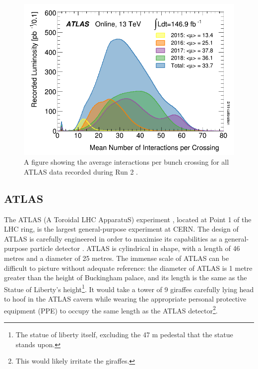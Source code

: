 \documentclass[12pt,a4paper,epsf,portrait,times,epsfig]{article}
\begin{document}
		\begin{figure}
			\centering
			\includegraphics[scale=0.4]{ATLAS_Pileup_Run2.png}
			\caption{A figure showing the average interactions per bunch crossing for all ATLAS data recorded during Run 2 \cite{ATLASLumiPublic}.}
			\label{Fig:ATLASPileup}
		\end{figure}

		\subsection{ATLAS}

		The ATLAS (A Toroidal LHC ApparatuS) experiment \cite{ATLAS_Collab}, located at Point 1 of the LHC ring, is the largest general-purpose experiment at CERN. The design of ATLAS is carefully engineered in order to maximise its capabilities as a general-purpose particle detector \cite{ATLAS-TDR-01, ATLAS-TDR-02, Article:ATLASDesignPaper}. ATLAS is cylindrical in shape, with a length of 46 metres and a diameter of 25 metres. The immense scale of ATLAS can be difficult to picture without adequate reference: the diameter of ATLAS is 1 metre greater than the height of Buckingham palace, and its length is the same as the Statue of Liberty's height\footnote{The statue of liberty itself, excluding the 47 m pedestal that the statue stands upon.}. It would take a tower of 9 giraffes carefully lying head to hoof in the ATLAS cavern while wearing the appropriate personal protective equipment (PPE) to occupy the same length as the ATLAS detector\footnote{This would likely irritate the giraffes.}. 
		
\end{document}

